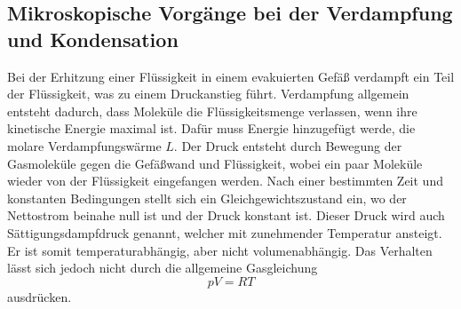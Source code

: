 \subsection{Mikroskopische Vorgänge bei der Verdampfung und Kondensation} %
\label{sub:Mikro_Vorgänge}
Bei der Erhitzung einer Flüssigkeit in einem evakuierten Gefäß verdampft ein Teil der Flüssigkeit, was zu einem Druckanstieg führt.
Verdampfung allgemein entsteht dadurch, dass Moleküle die Flüssigkeitsmenge verlassen, wenn ihre kinetische Energie maximal ist.
Dafür muss Energie hinzugefügt werde, die molare Verdampfungswärme $L$.
Der Druck entsteht durch Bewegung der Gasmoleküle gegen die Gefäßwand und Flüssigkeit, wobei ein paar Moleküle wieder von der Flüssigkeit eingefangen werden.
Nach einer bestimmten Zeit und konstanten Bedingungen stellt sich ein Gleichgewichtszustand ein, wo der Nettostrom beinahe null ist und der Druck konstant ist.
Dieser Druck wird auch Sättigungsdampfdruck genannt, welcher mit zunehmender Temperatur ansteigt.
Er ist somit temperaturabhängig, aber nicht volumenabhängig.
Das Verhalten lässt sich jedoch nicht durch die allgemeine Gasgleichung
\begin{equation*}
    pV = RT
\end{equation*}
ausdrücken.

 
